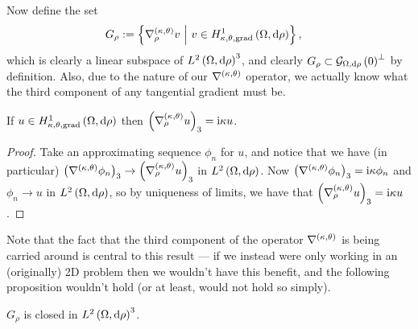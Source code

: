 \documentclass[11pt]{report}
\begin{document}
Now define the set
\begin{align*}
	G_\rho &:= \left\{  \nabla^{\left( \kappa, \theta \right)}_\rho v \ \middle\vert \  v\in H^1_{\kappa,\theta,\mathrm{grad}}\left( \Omega, \mathrm{d}\rho \right)  \right\},
\end{align*}
which is clearly a linear subspace of $L^{2}\left( \Omega,\mathrm{d}\rho \right)^3$, and clearly $G_\rho \subset \mathcal{G}_{ \Omega, \mathrm{d}\rho}\left( 0 \right)^\perp$ by definition.
Also, due to the nature of our $\nabla^{\left( \kappa, \theta \right)}$ operator, we actually know what the third component of any tangential gradient must be.
\begin{lemma} \label{lem:3rdComponentOfTangGradient}
	If $u\in H^1_{\kappa,\theta,\mathrm{grad}}\left( \Omega, \mathrm{d}\rho \right)$ then $\left( \nabla^{\left( \kappa, \theta \right)}_\rho u \right)_3 = \mathrm{i}\kappa u$.
\end{lemma}
\begin{proof}
	Take an approximating sequence $\phi_n$ for $u$, and notice that we have (in particular) $\left( \nabla^{\left( \kappa, \theta \right)}\phi_n \right)_3\rightarrow\left( \nabla^{\left( \kappa, \theta \right)}_\rho u \right)_3$ in $L^{2}\left( \Omega,\mathrm{d}\rho \right)$.
	Now $\left( \nabla^{\left( \kappa, \theta \right)}\phi_n \right)_3 = \mathrm{i}\kappa\phi_n$ and $\phi_n\rightarrow u$ in $L^{2}\left( \Omega,\mathrm{d}\rho \right)$, so by uniqueness of limits, we have that $\left( \nabla^{\left( \kappa, \theta \right)}_\rho u \right)_3 = \mathrm{i}\kappa u$.
\end{proof}
Note that the fact that the third component of the operator $\nabla^{\left( \kappa, \theta \right)}$ is being carried around is central to this result --- if we instead were only working in an (originally) 2D problem then we wouldn't have this benefit, and the following proposition wouldn't hold (or at least, would not hold so simply).
\begin{prop} \label{prop:TangGradsClosedSubspace}
	$G_\rho$ is closed in $L^{2}\left( \Omega,\mathrm{d}\rho \right)^3$.
\end{prop}
\end{document}
